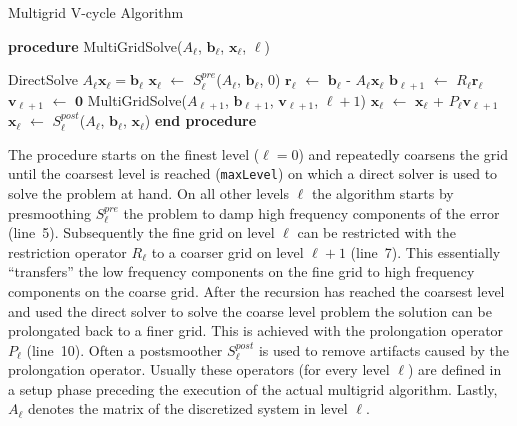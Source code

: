 \documentclass[a4paper,10pt,3p,preprint,pdftex]{elsarticle}
\begin{document}
\begin{algorithm}
  \caption{Multigrid V-cycle Algorithm} \label{alg:mg_algo}
  \begin{algorithmic}[1]
    \STATE \textbf{procedure} MultiGridSolve($A_\ell$, $\mathbf{b}_\ell$, $\mathbf{x}_\ell$, $\ell$)
    
    \STATE DirectSolve $A_\ell \mathbf{x}_\ell = \mathbf{b}_\ell$
    \ELSE
    \STATE $\mathbf{x}_\ell$ $\leftarrow$ $S^{pre}_\ell$($A_\ell$, $\mathbf{b}_\ell$, $0$) 
    \STATE $\mathbf{r}_\ell$ $\leftarrow$ $\mathbf{b}_\ell$ - $A_\ell
    \mathbf{x}_\ell$ 
    \STATE $\mathbf{b}_{\ell+1}$ $\leftarrow$ $R_\ell \mathbf{r}_\ell$
    \STATE $\mathbf{v}_{\ell+1}$ $\leftarrow$ $\mathbf{0}$
    \STATE MultiGridSolve($A_{\ell+1}$, $\mathbf{b}_{\ell+1}$,
    $\mathbf{v}_{\ell+1}$, $\ell\!+\!1$) 
    \STATE $\mathbf{x}_\ell$ $\leftarrow$ $\mathbf{x}_\ell$ + $P_\ell
    \mathbf{v}_{\ell+1}$  
    \STATE $\mathbf{x}_\ell$ $\leftarrow$ $S^{post}_\ell$($A_\ell$,
    $\mathbf{b}_\ell$, $\mathbf{x}_\ell$) 
    \ENDIF
    \STATE \textbf{end procedure}
  \end{algorithmic}
\end{algorithm}

The procedure starts on the finest level ($\ell\!=\!0$) and repeatedly
coarsens the grid until the coarsest level is reached
(\texttt{maxLevel}) on which a direct solver is used to solve the
problem at hand.  On all other levels $\ell$ the algorithm starts by
presmoothing $S_\ell^{pre}$ the problem to damp high frequency
components of the error (line~5).  Subsequently the fine grid on level
$\ell$ can be restricted with the restriction operator $R_\ell$ to a
coarser grid on level $\ell+ 1$ (line~7).  This essentially
``transfers'' the low frequency components on the fine grid to high
frequency components on the coarse grid.  After the recursion has
reached the coarsest level and used the direct solver to solve the
coarse level problem the solution can be prolongated back to a finer
grid.  This is achieved with the prolongation operator $P_\ell$
(line~10).  Often a postsmoother $S_\ell^{post}$ is used to remove
artifacts caused by the prolongation operator.  Usually these operators
(for every level $\ell$) are defined in a setup phase preceding the
execution of the actual multigrid algorithm.  Lastly, $A_\ell$ denotes
the matrix of the discretized system in level $\ell$. 
\end{document}
